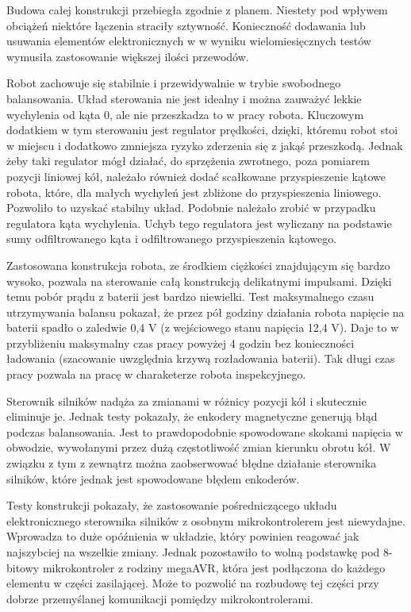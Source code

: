 \documentclass[a4paper,12pt,twoside,openany]{report}
\begin{document}
Budowa całej konstrukcji przebiegła zgodnie z planem. Niestety pod wpływem obciążeń niektóre łączenia straciły sztywność. Konieczność dodawania lub usuwania elementów elektronicznych w w wyniku wielomiesięcznych testów wymusiła zastosowanie większej ilości przewodów.

\newpage
Robot zachowuje się stabilnie i przewidywalnie w trybie swobodnego balansowania. Układ sterowania nie jest idealny i można zauważyć lekkie wychylenia od kąta 0\textdegree, ale nie przeszkadza to w pracy robota. Kluczowym dodatkiem w tym sterowaniu jest regulator prędkości, dzięki, któremu robot stoi w miejscu i dodatkowo zmniejsza ryzyko zderzenia się z jakąś przeszkodą. Jednak żeby taki regulator mógł działać, do sprzężenia zwrotnego, poza pomiarem pozycji liniowej kół, należało również dodać scałkowane przyspieszenie kątowe robota, które, dla małych wychyleń jest zbliżone do przyspieszenia liniowego. Pozwoliło to uzyskać stabilny układ. Podobnie należało zrobić w przypadku regulatora kąta wychylenia. Uchyb tego regulatora jest wyliczany na podstawie sumy odfiltrowanego kąta i odfiltrowanego przyspieszenia kątowego.

Zastosowana konstrukcja robota, ze środkiem ciężkości znajdującym się bardzo wysoko, pozwala na sterowanie całą konstrukcją delikatnymi impulsami. Dzięki temu pobór prądu z baterii jest bardzo niewielki. Test maksymalnego czasu utrzymywania balansu pokazał, że przez pół godziny działania robota napięcie na baterii spadło o zaledwie 0,4 V (z wejściowego stanu napięcia 12,4 V). Daje to w przybliżeniu maksymalny czas pracy powyżej 4 godzin bez konieczności ładowania (szacowanie uwzględnia krzywą rozładowania baterii). Tak długi czas pracy pozwala na pracę w charaketerze robota inspekcyjnego. 

Sterownik silników nadąża za zmianami w różnicy pozycji kół i skutecznie eliminuje je. Jednak testy pokazały, że enkodery magnetyczne generują błąd podczas balansowania. Jest to prawdopodobnie spowodowane skokami napięcia w obwodzie, wywołanymi przez dużą częstotliwość zmian kierunku obrotu kół. W związku z tym z zewnątrz można zaobserwować błędne działanie sterownika silników, które jednak jest spowodowane błędem enkoderów.

Testy konstrukcji pokazały, że zastosowanie pośredniczącego układu elektronicznego sterownika silników z osobnym mikrokontrolerem jest niewydajne. Wprowadza to duże opóźnienia w układzie, który powinien reagować jak najszybciej na wszelkie zmiany. Jednak pozostawiło to wolną podstawkę pod 8-bitowy mikrokontroler z rodziny megaAVR, która jest podłączona do każdego elementu w części zasilającej. Może to pozwolić na rozbudowę tej części przy dobrze przemyślanej komunikacji pomiędzy mikrokontrolerami.
\end{document}
